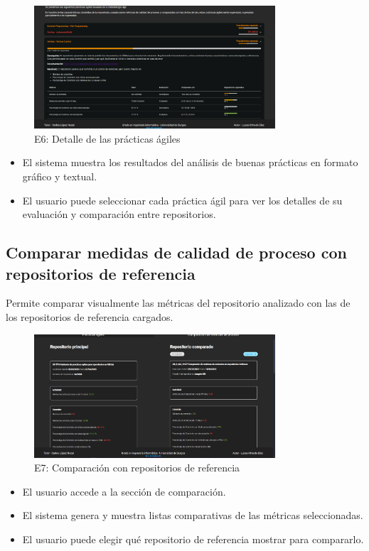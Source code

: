 \begin{figure}[H]
\centering
\includegraphics[width=0.8\textwidth]{img/E6.1-detalle-practicas-agiles.png}
\caption{E6: Detalle de las prácticas ágiles}
\label{fig:E6.1-detalle-practicas-agiles}
\end{figure}

\begin{itemize}
    \item El sistema muestra los resultados del análisis de buenas prácticas en formato gráfico y textual.
    \item El usuario puede seleccionar cada práctica ágil para ver los detalles de su evaluación y comparación entre repositorios.
\end{itemize}

\newpage
\subsection{ Comparar medidas de calidad de proceso con repositorios de referencia}

Permite comparar visualmente las métricas del repositorio analizado con las de los repositorios de referencia cargados.

\begin{figure}[H]
\centering
\includegraphics[width=0.8\textwidth]{img/E7-metricas.png}
\caption{E7: Comparación con repositorios de referencia}
\label{fig:E7-metricas}
\end{figure}

\begin{itemize}
    \item El usuario accede a la sección de comparación.
    \item El sistema genera y muestra listas comparativas de las métricas seleccionadas.
    \item El usuario puede elegir qué repositorio de referencia mostrar para compararlo.
\end{itemize}
